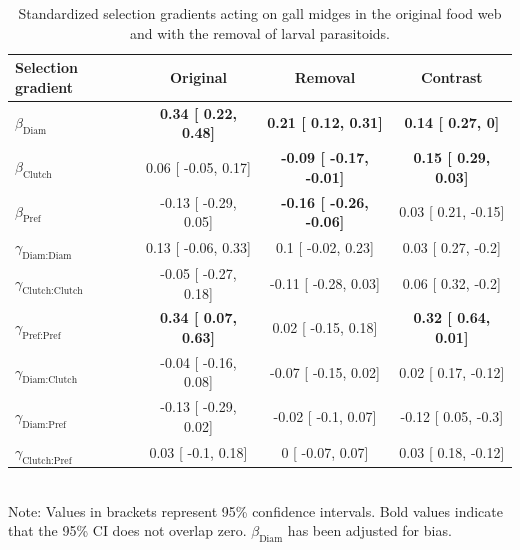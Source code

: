 \documentclass[11pt,]{article}
\begin{document}
\begin{table}[h]
\caption{Standardized selection gradients acting on gall midges in the original food web and with the removal of larval parasitoids.}
\label{Table:Gradients}
\centering
\begin{tabular}{lccc}
\\ 
\hline
\textbf{Selection gradient} & \textbf{Original} & \textbf{Removal} & \textbf{Contrast} \\
\hline
$\beta_{\text{Diam}}$ & 
\textbf{
0.34 [
0.22,
0.48] } & 
\textbf{
0.21 [
0.12,
0.31] } & 
\textbf{
0.14 [
0.27,
0] }\\

$\beta_{\text{Clutch}}$ & 
0.06 [
-0.05,
0.17] & 
\textbf{
-0.09 [
-0.17,
-0.01] } & 
\textbf{
0.15 [
0.29,
0.03] }\\

$\beta_{\text{Pref}}$ &
-0.13 [
-0.29,
0.05] & 
\textbf{
-0.16 [
-0.26,
-0.06] } & 

0.03 [
0.21,
-0.15] \\

$\gamma_{\text{Diam:Diam}}$ &
0.13 [
-0.06,
0.33] & 

0.1 [
-0.02,
0.23] & 

0.03 [
0.27,
-0.2] \\

$\gamma_{\text{Clutch:Clutch}}$ & 
-0.05 [
-0.27,
0.18] & 

-0.11 [
-0.28,
0.03] & 

0.06 [
0.32,
-0.2] \\

$\gamma_{\text{Pref:Pref}}$ & 
\textbf{
0.34 [
0.07,
0.63] }& 

0.02 [
-0.15,
0.18] & 
\textbf{
0.32 [
0.64,
0.01] }\\

$\gamma_{\text{Diam:Clutch}}$ & 
-0.04 [
-0.16,
0.08] & 

-0.07 [
-0.15,
0.02] & 

0.02 [
0.17,
-0.12] \\

$\gamma_{\text{Diam:Pref}}$ & 
-0.13 [
-0.29,
0.02] & 

-0.02 [
-0.1,
0.07] & 

-0.12 [
0.05,
-0.3] \\

$\gamma_{\text{Clutch:Pref}}$ & 
0.03 [
-0.1,
0.18] & 

0 [
-0.07,
0.07] & 

0.03 [
0.18,
-0.12] \\ 
\hline
\end{tabular}
\bigskip{}
\\
{\footnotesize Note: Values in brackets represent 95\% confidence intervals. Bold values indicate that the 95\% CI does not overlap zero. $\beta_{\text{Diam}}$ has been adjusted for bias.}
\end{table}
\end{document}
